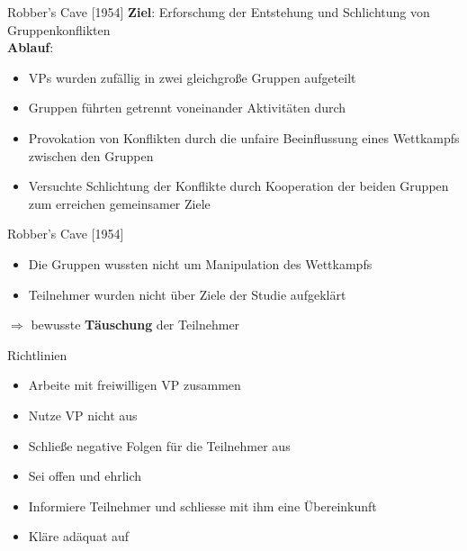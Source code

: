 \documentclass[10pt]{beamer}
\begin{document}
	\begin{frame}{Robber's Cave [1954]}
		\textbf{Ziel}: Erforschung der Entstehung und Schlichtung von Gruppenkonflikten\\
		\textbf{Ablauf}:
		
			
		\begin{itemize}
			\item VPs wurden zufällig in zwei gleichgroße Gruppen aufgeteilt
			\item Gruppen führten getrennt voneinander Aktivitäten durch
			\item Provokation von Konflikten durch die unfaire Beeinflussung eines Wettkampfs zwischen den Gruppen
			\item Versuchte Schlichtung der Konflikte durch Kooperation der beiden Gruppen zum erreichen gemeinsamer Ziele
		\end{itemize}
		
	\end{frame}	

	\begin{frame}{Robber's Cave [1954]}
		\begin{itemize}
			\item Die Gruppen wussten nicht um Manipulation des Wettkampfs
			\item Teilnehmer wurden nicht über Ziele der Studie aufgeklärt
		\end{itemize}
		$\Rightarrow$ bewusste \textbf{Täuschung} der Teilnehmer
	\end{frame}	

	\begin{frame}{Richtlinien}
		
		\begin{itemize}
			\item Arbeite mit freiwilligen VP zusammen
			\item Nutze VP nicht aus
			\item Schließe negative Folgen für die Teilnehmer aus
			\item Sei offen und ehrlich
			\item Informiere Teilnehmer und schliesse mit ihm eine Übereinkunft
			\item Kläre adäquat auf
		
		\end{itemize}
		
	\end{frame}
	
\end{document}
